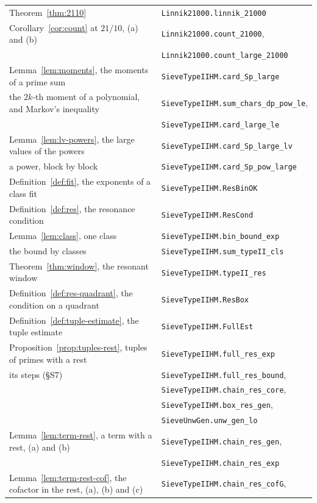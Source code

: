 \documentclass[11pt]{article}
\theoremstyle{definition}
\newcommand{\lean}[1]{\texttt{#1}}
\begin{document}
{\begin{longtable}{@{}>{\raggedright\arraybackslash}p{}l@{}}
Theorem~\ref{thm:2110} & \lean{Linnik21000.linnik\_21000} \\
Corollary~\ref{cor:count} at $21/10$, (a) and (b) & \lean{Linnik21000.count\_21000}, \\
 & \lean{Linnik21000.count\_large\_21000} \\
Lemma~\ref{lem:moments}, the moments of a prime sum & \lean{SieveTypeIIHM.card\_Sp\_large} \\
\quad the $2k$-th moment of a polynomial, and Markov's inequality & \lean{SieveTypeIIHM.sum\_chars\_dp\_pow\_le}, \\
 & \lean{SieveTypeIIHM.card\_large\_le} \\
Lemma~\ref{lem:lv-powers}, the large values of the powers & \lean{SieveTypeIIHM.card\_Sp\_large\_lv} \\
\quad a power, block by block & \lean{SieveTypeIIHM.card\_Sp\_pow\_large} \\
Definition~\ref{def:fit}, the exponents of a class fit & \lean{SieveTypeIIHM.ResBinOK} \\
Definition~\ref{def:res}, the resonance condition & \lean{SieveTypeIIHM.ResCond} \\
Lemma~\ref{lem:class}, one class & \lean{SieveTypeIIHM.bin\_bound\_exp} \\
\quad the bound by classes & \lean{SieveTypeIIHM.sum\_typeII\_cls} \\
Theorem~\ref{thm:window}, the resonant window & \lean{SieveTypeIIHM.typeII\_res} \\
Definition~\ref{def:res-quadrant}, the condition on a quadrant & \lean{SieveTypeIIHM.ResBox} \\
Definition~\ref{def:tuple-estimate}, the tuple estimate & \lean{SieveTypeIIHM.FullEst} \\
Proposition~\ref{prop:tuples-rest}, tuples of primes with a rest & \lean{SieveTypeIIHM.full\_res\_exp} \\
\quad its steps (\S S7) & \lean{SieveTypeIIHM.full\_res\_bound}, \\
 & \lean{SieveTypeIIHM.chain\_res\_core}, \\
 & \lean{SieveTypeIIHM.box\_res\_gen}, \\
 & \lean{SieveUnwGen.unw\_gen\_lo} \\
Lemma~\ref{lem:term-rest}, a term with a rest, (a) and (b) & \lean{SieveTypeIIHM.chain\_res\_gen}, \\
 & \lean{SieveTypeIIHM.chain\_res\_exp} \\
Lemma~\ref{lem:term-rest-cof}, the cofactor in the rest, (a), (b) and (c) & \lean{SieveTypeIIHM.chain\_res\_cofG}, \\

\end{longtable}}
\end{document}
